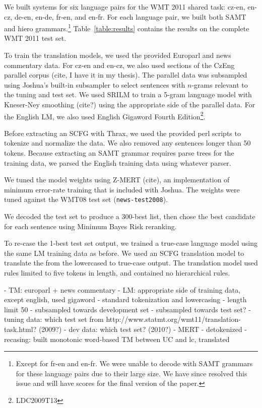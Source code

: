 \documentclass[11pt]{article}
\begin{document}
We built systems for six language pairs for the WMT 2011 shared task:
cz-en, en-cz, de-en, en-de, fr-en, and en-fr.  For each language pair,
we built both SAMT and hiero grammars.\footnote{Except for fr-en and
  en-fr.  We were unable to decode with SAMT grammars for these
  language pairs due to their large size.  We have since resolved this
  issue and will have scores for the final version of the paper.}
Table~\ref{table:results} contains the results on the complete WMT
2011 test set.

To train the translation models, we used the provided Europarl and news commentary data. For cz-en and en-cz, we also used sections of the CzEng parallel corpus {\sc (cite, I have it in my thesis)}. The parallel data was subsampled using Joshua's built-in subsampler to select sentences with $n$-grams relevant to the tuning and test set. We used SRILM to train a 5-gram language model with Kneser-Ney smoothing {\sc (cite?)} using the appropriate side of the parallel data. For the English LM, we also used English Gigaword Fourth Edition\footnote{LDC2009T13}.

Before extracting an SCFG with Thrax, we used the provided perl scripts to tokenize and normalize the data. We also removed any sentences longer than 50 tokens. Because extracting an SAMT grammar requires parse trees for the training data, we parsed the English training data using {\sc whatever parser}.

We tuned the model weights using Z-MERT {\sc (cite)}, an implementation of minimum error-rate training that is included with Joshua. The weights were tuned against the WMT08 test set ({\tt news-test2008}).

We decoded the test set to produce a 300-best list, then chose the best candidate for each sentence using Minimum Bayes Risk reranking.

To re-case the 1-best test set output, we trained a true-case language model using the same LM training data as before. We used an SCFG translation model to translate the from the lowercased to true-case output. The translation model used rules limited to five tokens in length, and contained no hierarchical rules.

- TM: europarl + news commentary
- LM: appropriate side of training data, except english, used gigaword
- standard tokenization and lowercasing
- length limit 50
- subsampled towards development set
- subsampled towards test set?
- tuning data: which test set from
  http://www.statmt.org/wmt11/translation-task.html? (2009?)
- dev data: which test set? (2010?)
- MERT
- detokenized
- recasing: built monotonic word-based TM between UC and lc,
  translated
\end{document}
